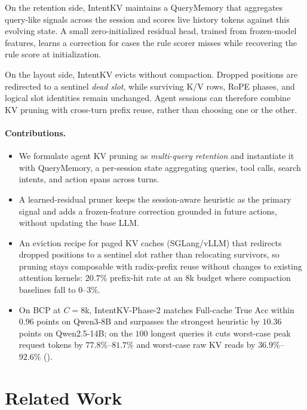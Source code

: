 \documentclass[11pt]{article}
\newcommand{\method}{IntentKV\xspace}
\newcommand{\learn}{Phase-2\xspace}
\begin{document}
On the retention side, \method maintains a QueryMemory that
aggregates query-like signals across the session and scores live
history tokens against this evolving state. A small zero-initialized
residual head, trained from frozen-model features, learns a correction
for cases the rule scorer misses while recovering the rule score at
initialization.

On the layout side, \method evicts without compaction. Dropped
positions are redirected to a sentinel \emph{dead slot}, while
surviving K/V rows, RoPE phases, and logical slot identities remain
unchanged. Agent sessions can therefore combine KV pruning with
cross-turn prefix reuse, rather than choosing one or the other.

\paragraph{Contributions.}
\begin{itemize}[itemsep=1pt,parsep=0pt,topsep=2pt]
    \item We formulate agent KV pruning as \emph{multi-query
    retention} and instantiate it with QueryMemory, a per-session
    state aggregating queries, tool calls, search intents, and action
    spans across turns.
    \item A learned-residual pruner keeps the session-aware
    heuristic as the primary signal and adds a frozen-feature
    correction grounded in future actions, without updating the base
    LLM.
    \item An eviction recipe for paged KV caches (SGLang/vLLM) that
    redirects dropped positions to a sentinel slot rather than
    relocating survivors, so pruning stays composable with
    radix-prefix reuse without changes to existing attention kernels:
    $20.7\%$ prefix-hit rate at an $8$k budget where compaction
    baselines fall to $0$--$3\%$.
    \item On BCP at $C{=}8$k, \method-\learn matches Full-cache True
    Acc within $0.96$ points on Qwen3-8B and surpasses the strongest
    heuristic by $10.36$ points on Qwen2.5-14B; on the $100$ longest
    queries it cuts worst-case peak request tokens by
    $77.8\%$--$81.7\%$ and worst-case raw KV reads by
    $36.9\%$--$92.6\%$ ().
\end{itemize}

\section{Related Work}
\label{sec:related}
\end{document}
